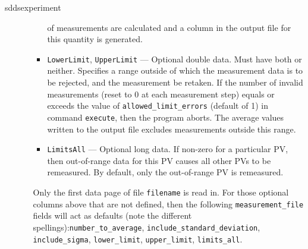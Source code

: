 \begin{sddsprog}{sddsexperiment}
\begin{itemize}
\begin{itemize}
\begin{itemize}
                of measurements are calculated and a column in the output file for this quantity
                is generated.
      \item {\verb+LowerLimit+}, {\verb+UpperLimit+} --- Optional double data. Must have
                both or neither. Specifies a range outside of which the measurement
                data is to be rejected, and the measurement be retaken.
                If the number of invalid measurements (reset to 0 at each
                measurement step) equals or exceeds the value
                of {\verb+allowed_limit_errors+} (default of 1) in command {\verb+execute+},
                then the program aborts.
                The average values written to the output file excludes measurements outside this range.
      \item {\verb+LimitsAll+} --- Optional long data. If non-zero for a particular PV, then
                out-of-range data for this PV causes all other PVs to be remeasured.
                By default, only the out-of-range PV is remeasured.
    \end{itemize}
                Only the first data page of file {\verb+filename+} is read in. For those
                optional columns above that are not defined, then the following {\verb+measurement_file+} fields
                will act as defaults (note the different spellings):{\verb+number_to_average+},
                {\verb+include_standard_deviation+}, {\verb+include_sigma+},
                {\verb+lower_limit+}, {\verb+upper_limit+}, {\verb+limits_all+}.
  \end{itemize}



\end{itemize}
\end{sddsprog}
